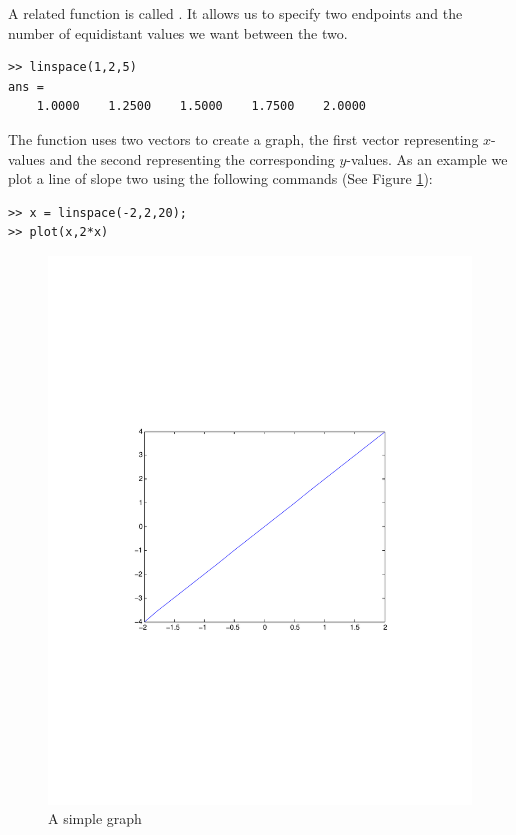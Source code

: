A related function is called . It allows us to specify two endpoints and the number of equidistant values we want between the two.

\begin{lstlisting}[style=matlab]
>> linspace(1,2,5)
ans =
    1.0000    1.2500    1.5000    1.7500    2.0000
\end{lstlisting}

The  function uses two vectors to create a graph, the first vector representing $x$-values and the second representing the corresponding $y$-values.  As an example we plot a line of slope two using the following commands (See Figure \ref{fig:graph}):

\begin{lstlisting}[style=matlab]
>> x = linspace(-2,2,20);
>> plot(x,2*x)
\end{lstlisting}

\begin{figure}
\vspace{-100pt}
\begin{center}
	\includegraphics[scale=.5]{./FiguresMAT/graph}
\end{center}
\vspace{-100pt}
\caption{A simple graph}
\label{fig:graph}
\end{figure}

